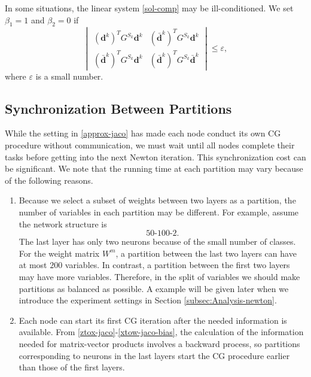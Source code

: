 \documentclass[12pt]{article}
\newcounter{bar}
\def\bd{{\boldsymbol d}}
\begin{document}
\par In some situations, the linear system \eqref{sol-comp} may be ill-conditioned. We set $\beta_1 = 1$ and $\beta_2 = 0$ if
\begin{equation}
\label{determinant}
	\begin{vmatrix} (\bd^k)^T G^{S_k} \bd^k & (\bar{\bd}^k)^T G^{S_k}\bd^k \\ (\bar{\bd}^k)^T G^{S_k} \bd^k & (\bar{\bd}^k)^T G^{S_k}\bar{\bd}^k \end{vmatrix} \leq \varepsilon,
\end{equation}
where $\varepsilon$ is a small number.

\subsection{Synchronization Between Partitions}
\label{subsec:Synchronization}
While the setting in \eqref{approx-jaco} has made each node conduct its own CG procedure without communication, we must
wait until all nodes complete their tasks before getting into the next Newton iteration.
This synchronization cost can be significant. We note that the running time at each partition may vary because of the following reasons.
\begin{enumerate}[1.]
\item
Because we select a subset of weights between two layers as a partition, the number of variables in each partition may be different. For
example, assume the network structure is 
\begin{equation*}
	50\text{-}100\text{-}2.
\end{equation*}
The last layer has only two neurons because of the small number of classes. 
For the weight matrix $W^m$, a partition between the last two layers can have at most $200$ variables. 
In contrast, a partition between the first two layers may have more variables. 
Therefore, in the split of variables we should make partitions as balanced as possible.
A example will be given later when we introduce the experiment settings in Section \ref{subsec:Analysis-newton}.

\item 
Each node can start its first CG iteration after the needed information is available. 
From \eqref{ztox-jaco}-\eqref{xtow-jaco-bias}, the calculation of the information needed for matrix-vector products 
involves a backward process, so partitions corresponding to neurons in the last layers start the CG procedure earlier than those of the first layers.
\end{enumerate}
\end{document}
